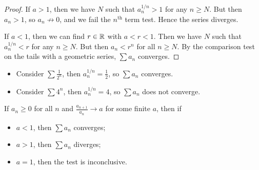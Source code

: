 \documentclass{../../template/note}
\begin{document}
    \begin{proof}
        If \(a > 1\), then we have \(N\) such that \(a_n^{1/n} > 1\) for any \(n \geq N\). But then \(a_n > 1\), so \(a_n \not\to 0\), and we fail the \(n^\text{th}\) term test. Hence the series diverges.

        If \(a < 1\), then we can find \(r \in \mathbb R\) with \(a < r < 1\). Then we have \(N\) such that \(a_n^{1/n} < r\) for any \(n \geq N\). But then \(a_n < r^n\) for all \(n \geq N\). By the comparison test on the tails with a geometric series, \(\sum a_n\) converges.
    \end{proof}
    
    \begin{example}
        \begin{itemize}
            \item Consider \(\sum \frac 1{2^n}\), then \(a_n^{1/n} = \frac{1}{2}\), so \(\sum a_n\) converges.
            \item Consider \(\sum 4^n\), then \(a_n^{1/n} = 4\), so \(\sum a_n\) does not converge.
        \end{itemize}
    \end{example}

    \begin{proposition}
        If \(a_n \geq 0\) for all \(n\) and \(\frac{a_{n+1}}{a_n} \to a\) for some finite \(a\), then if
        \begin{itemize}
            \item \(a < 1\), then \(\sum a_n\) converges;
            \item \(a > 1\), then \(\sum a_n\) diverges;
            \item \(a = 1\), then the test is inconclusive.
        \end{itemize}
    \end{proposition}
    
\end{document}
